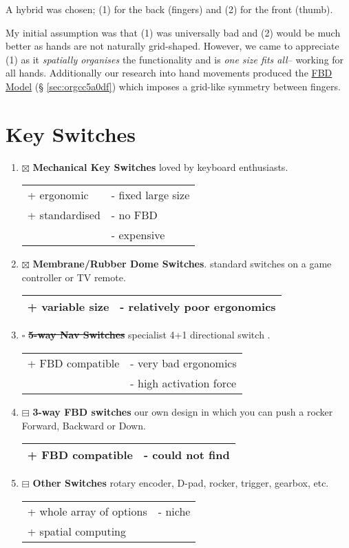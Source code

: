 \documentclass[logo,bsc,singlespacing,parskip]{infthesis}
\begin{document}
A hybrid was chosen; (1) for the back (fingers) and (2) for the front (thumb).

My initial assumption was that (1) was universally bad and (2) would be much better as hands are not naturally grid-shaped.
However, we came to appreciate (1) as it \emph{spatially organises} the functionality and is \emph{one size fits all}-- working for all hands.
Additionally our research into hand movements produced the \hyperref[sec:orgcc5a0df]{FBD Model} (§ \ref{sec:orgcc5a0df}) which imposes a grid-like symmetry between fingers.
\section{Key Switches}
\label{sec:org0098981}
\begin{enumerate}
\item{$\boxtimes$} \textbf{Mechanical Key Switches} loved by keyboard enthusiasts.
\begin{longtable}{|p{6.25cm}|p{6.25cm}|}
\hline
+ ergonomic & - fixed large size\\
+ standardised & - no FBD\\
 & - expensive\\
\hline
\end{longtable}
\item{$\boxtimes$} \textbf{Membrane/Rubber Dome Switches}. standard switches on a game controller or TV remote.
\begin{longtable}{|p{6.25cm}|p{6.25cm}|}
\hline
+ variable size & - relatively poor ergonomics\\
\hline
\end{longtable}
\item{$\square$} \sout{\textbf{5-way Nav Switches}} specialist 4+1 directional switch \autocite{Thruhole5wayNavigation}.
\begin{longtable}{|p{6.25cm}|p{6.25cm}|}
\hline
+ FBD compatible & - very bad ergonomics\\
 & - high activation force\\
\hline
\end{longtable}
\item{$\boxminus$} \textbf{3-way FBD switches} our own design in which you can push a rocker Forward, Backward or Down.
\begin{longtable}{|p{6.25cm}|p{6.25cm}|}
\hline
+ FBD compatible & - could not find\\
\hline
\end{longtable}
\item{$\boxminus$} \textbf{Other Switches} rotary encoder, D-pad, rocker, trigger, gearbox, etc.
\begin{longtable}{|p{6.25cm}|p{6.25cm}|}
\hline
+ whole array of options & - niche\\
+ spatial computing & \\
\hline
\end{longtable}
\end{enumerate}
\end{document}
